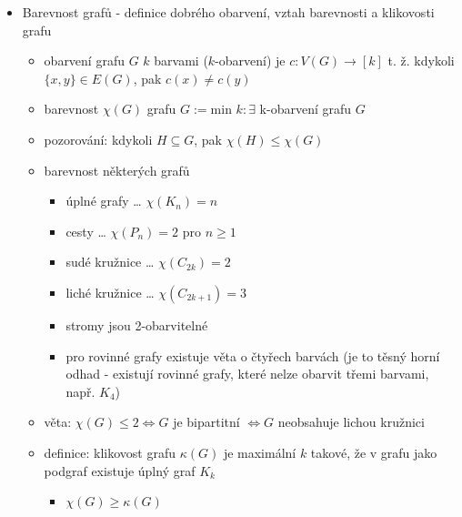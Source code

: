 \begin{itemize}
\begin{itemize}
\begin{itemize}
\item maximální rovinné grafy bez trojúhelníků mají stěny čtvercové, pětiúhelníkové, nebo to může být strom ve tvaru hvězdy
\item pro čtvercově stěny platí $4f=2e$, pro pětiúhelníkové $5f=2e$
\item obecně $4f\leq 2e\to f\leq \frac 12 e$
\item $v+\frac 12e\geq e+2$
\item $e\leq 2v-4$
\item průměrný stupeň $\leq {4v-8\over v} \lt$ 4
\item existuje vrchol stupně max. 3
\end{itemize}
\end{itemize}
\item Barevnost grafů - definice dobrého obarvení, vztah barevnosti a klikovosti grafu
\begin{itemize}
\item obarvení grafu $G$ $k$ barvami ($k$-obarvení) je $c:V(G)\to[k]$ t. ž. kdykoli $\lbrace x,y\rbrace\in E(G)$, pak $c(x)\neq c(y)$
\item barevnost $\chi(G)$ grafu $G:=\text{min }k:\exists$ k-obarvení grafu $G$
\item pozorování: kdykoli $H\subseteq G$, pak $\chi(H)\leq \chi(G)$
\item barevnost některých grafů
\begin{itemize}
\item úplné grafy \dots{} $\chi(K_n)=n$
\item cesty \dots{} $\chi(P_n)=2$ pro $n\geq 1$
\item sudé kružnice \dots{} $\chi(C_{2k})=2$
\item liché kružnice \dots{} $\chi(C_{2k+1})=3$
\item stromy jsou 2-obarvitelné
\item pro rovinné grafy existuje věta o čtyřech barvách (je to těsný horní odhad - existují rovinné grafy, které nelze obarvit třemi barvami, např. $K_4$)
\end{itemize}
\item věta: $\chi(G)\leq 2\iff G$ je bipartitní $\iff G$ neobsahuje lichou kružnici
\item definice: klikovost grafu $\kappa(G)$ je maximální $k$ takové, že v grafu jako podgraf existuje úplný graf $K_k$
\begin{itemize}
\item $\chi(G)\geq\kappa(G)$
\end{itemize}

\end{itemize}
\end{itemize}
